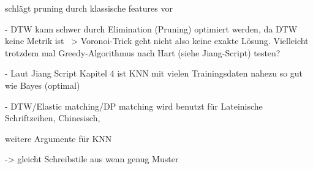 \cite{Watt:2005p1816} schlägt pruning durch klassische features vor

- DTW kann schwer durch Elimination (Pruning) optimiert werden, da DTW keine Metrik ist ~> Voronoi-Trick geht nicht also keine exakte Lösung. Vielleicht trotzdem mal Greedy-Algorithmus nach Hart (siehe Jiang-Script) testen?

- Laut Jiang Script Kapitel 4 ist KNN mit vielen Trainingsdaten nahezu so gut wie Bayes (optimal)

- DTW/Elastic matching/DP matching wird benutzt für Lateinische Schriftzeihen, Chinesisch, \cite{Tappert:1990p10302}

weitere Argumente für KNN

-> gleicht Schreibstile aus wenn genug Muster

